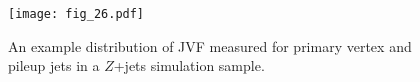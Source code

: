 
\begin{figure}
\centering
\texttt{[image: fig\_26.pdf]}
\caption{An example distribution of JVF measured for primary vertex and pileup jets in a $Z$+jets simulation sample.}
\label{fig:jet-reconstruction:jvf}
\end{figure}



